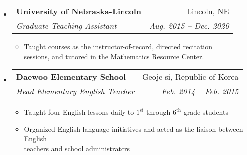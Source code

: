 \documentclass[letterpaper,11pt]{article}
\makeatletter
\newcommand{\resitem}[1]{\item #1 \vspace{-2pt}}
\newcommand{\ressubheading}[4]{
\begin{tabular*}{6.5in}{l@{\extracolsep{\fill}}r}
		\textbf{#1} & #2 \\
		\textit{#3} & \textit{#4} \\
\end{tabular*}\vspace{-6pt}}
\makeatother
\begin{document}
\begin{itemize}
	\item
	{\ressubheading{University of Nebraska-Lincoln}{Lincoln, NE}{Graduate Teaching Assistant}{Aug. 2015 -- Dec. 2020}
		{ \footnotesize
			\begin{itemize}
				\resitem{Taught courses as the instructor-of-record, directed recitation \\ sessions, and tutored in the Mathematics Resource Center.}
	\end{itemize}}}
	
	\item 
	\begin{samepage}
		\ressubheading{Daewoo Elementary School}{Geoje-si, Republic of Korea}{Head Elementary English Teacher}{Feb. 2014 -- Feb. 2015}
		{\footnotesize
			\begin{itemize}
				\resitem{Taught four English lessons daily to $1^{\text{st}}$ through $6^{\text{th}}$-grade students}
				\resitem{Organized English-language initiatives and acted as the liaison between  English \\ teachers and school administrators}
			\end{itemize}
		}
	\end{samepage}

\end{itemize}
\end{document}
